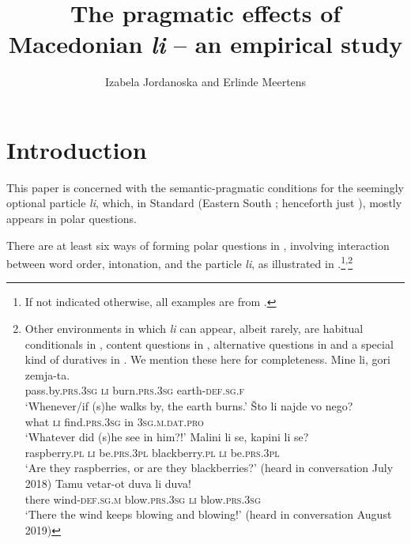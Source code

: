 \documentclass[output=paper,
colorlinks,
citecolor=brown,
newtxmath
]{langscibook}
\author{Izabela Jordanoska\affiliation{University of Vienna} and Erlinde Meertens\affiliation{University of Konstanz}}
\title{The pragmatic effects of Macedonian \textit{li} -- an empirical study}
\begin{document}
\maketitle

    \largerpage[-2]

\section{Introduction}

This paper is concerned with the semantic-pragmatic conditions for the seemingly optional particle \textit{li}, which, in Standard  (Eastern South ; henceforth just ), mostly appears in polar questions.

There are at least six ways of forming polar questions in , involving interaction between word order, intonation, and the particle \textit{li}, as illustrated in .\footnote{If not indicated otherwise, all examples are from .}\textsuperscript{,}\footnote{Other environments in which \textit{li} can appear, albeit rarely, are habitual conditionals in , content questions in , alternative questions in  and a special kind of duratives in . We mention these here for completeness.
\ea
\ea \gll Mine li, gori zemja-ta.\\
    pass.by.\textsc{prs.3sg} \textsc{li} burn.\textsc{prs.3sg} earth-\textsc{def.sg.f}\\
    \glt `Whenever/if (s)he walks by, the earth burns.' \label{cond} \hfill  \citep[539]{koneski1987}
        \ex \gll Što li najde vo nego? \\
what \textsc{li} find.\textsc{prs.3sg} in \textsc{3sg.m.dat.pro} \\
\glt `Whatever did (s)he see in him?!' \label{sto} \hfill  \citep[561]{Rudin.Kramer.Billings.Baerman1999}
        \ex  \gll Malini li se, kapini li se? \\
raspberry.\textsc{pl} \textsc{li} be.\textsc{prs.3pl} blackberry.\textsc{pl} \textsc{li} be.\textsc{prs.3pl} \\
\glt `Are they raspberries, or are they blackberries?' \label{altq}  \hfill  (heard in conversation July 2018)
        \ex \gll Tamu vetar-ot duva li duva! \\
there wind-\textsc{def.sg.m} blow.\textsc{prs.3sg} \textsc{li} blow.\textsc{prs.3sg} \\ \glt
`There the wind keeps blowing and blowing!'  \label{dur} \hfill (heard in conversation August 2019)

\z\z}
\end{document}
